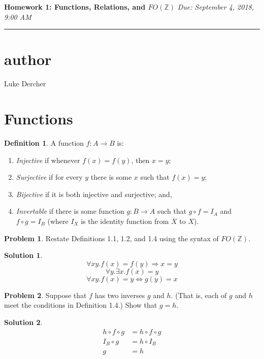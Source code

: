 \documentclass[10pt]{article}
\theoremstyle{definition}
\newtheorem{defn}{Definition}
\newtheorem{prob}{Problem}
\newtheorem{sol}{Solution}
\begin{document}
  
  \noindent
  \textbf{Homework 1: Functions, Relations, and $FO(\mathbb Z)$} \hfill \emph{Due: September 4, 2018, 9:00 AM}
  \hrule
  
  \vspace{.3in}
  \section*{author}{Luke Dercher}
  
  \section*{Functions}
  
  \begin{defn}
    A function $f : A \to B$ is:
    \begin{enumerate}
    \item \emph{Injective} if whenever $f(x) = f(y)$, then $x = y$;
    \item \emph{Surjective} if for every $y$ there is some $x$ such that $f(x) = y$;
    \item \emph{Bijective} if it is both injective and surjective; and,
    \item \emph{Invertable} if there is some function $g : B \to A$ such that $g \circ f = I_A$ and
      $f \circ g = I_B$ (where $I_X$ is the identity function from $X$ to $X$).
    \end{enumerate}
  \end{defn}
  
  \begin{prob}
    Restate Definitions 1.1, 1.2, and 1.4 using the syntax of $FO(\mathbb Z)$.
  \end{prob}
  \begin{sol}
    \begin{equation}
        \forall xy.f(x) = f(y) \Rightarrow x = y
    \end{equation}
      \begin{equation}   
      \forall y. \exists x. f(x) = y
      \end{equation}
      \begin{equation}
        \forall xy. f(x) = y \Leftrightarrow g(y) = x
      \end{equation}
  \end{sol}
  
  \begin{prob}
    Suppose that $f$ has two inverses $g$ and $h$.  (That is, each of $g$ and $h$ meet the conditions
    in Definition 1.4.)  Show that $g = h$.
  \end{prob}
  \begin{sol}
      \begin{align}
      h \circ f \circ g &= h \circ f \circ g \\
    I_B \circ g &= h \circ I_B \\
      g &= h 
      \end{align}
  \end{sol}
  
\end{document}
